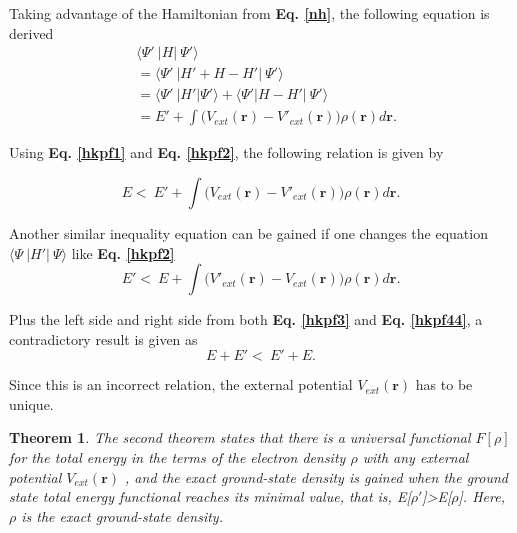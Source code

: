 \documentclass[a4paper, 12pt, titlepage,oneside,drop]{kthesis}
\newtheorem{thm}{Theorem}
\begin{document}
Taking advantage of the Hamiltonian from \textbf{Eq. \ref{nh}}, the following equation is derived
\begin{equation}\label{hkpf2}\begin{split}
&    \langle \Psi'\ |{H}|\ \Psi' \rangle \\
&  = \langle \Psi'\ |{H'} + {H} - {H'}|\ \Psi' \rangle \\
&  = \langle \Psi'\ |{H'} |\Psi' \rangle + \langle \Psi' | {H} - {H'}|\ \Psi' \rangle \\
&  = E' + \int \Big( V_{ext}(\textbf{r}) - V'_{ext}(\textbf{r}) \Big)  \rho(\textbf{r}) d \textbf{r}.
\end{split}\end{equation}

Using \textbf{Eq. \ref{hkpf1}} and \textbf{Eq. \ref{hkpf2}}, the following relation is given by

\begin{equation}\label{hkpf3}
 E  < \  E' + \int \Big( V_{ext}(\textbf{r}) - V'_{ext}(\textbf{r}) \Big)  \rho(\textbf{r}) d \textbf{r} .
\end{equation}

Another similar inequality equation can be gained if one changes the equation $\langle \Psi\ |{H'}|\ \Psi \rangle$ like \textbf{Eq. \ref{hkpf2}}
\begin{equation}\label{hkpf44}
  E'  < \  E + \int \Big( V'_{ext}(\textbf{r}) - V_{ext}(\textbf{r}) \Big)  \rho(\textbf{r}) d \textbf{r} .
\end{equation}

Plus the left side and right side from both \textbf{Eq. \ref{hkpf3}} and \textbf{Eq. \ref{hkpf44}}, a contradictory result is given as
\begin{equation}\label{hkpf4}
  E + E'  < \  E' + E.
\end{equation}

Since this is an incorrect relation, the external potential $V_{ext}(\textbf{r})$ has to be unique.

\begin{thm}
\label{hk2}
\noindent The second theorem states that there is a universal functional $F[\rho]$ for the total energy in the terms of the electron density $\rho$ with any external potential $V_{ext}(\textbf{r})$ ,
and the exact ground-state density is gained when the ground state total energy functional reaches its minimal value, that is, E[$\rho'$]>E[$\rho$]. Here, $\rho$ is the exact ground-state density.
\end{thm}
\end{document}
